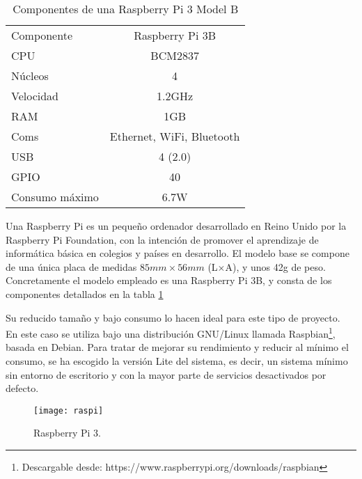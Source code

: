 \begin{table}[H]
	\begin{center}
		\begin{tabular}{l | c}\hline
			\toprule
			Componente & Raspberry Pi 3B\\
			\otoprule
			CPU & BCM2837\\
			Núcleos & 4\\
			Velocidad & 1.2GHz\\
			RAM & 1GB\\
			Coms & Ethernet, WiFi, Bluetooth\\
			USB & 4 (2.0)\\
			GPIO & 40\\
			Consumo máximo & 6.7W\\
			\bottomrule
		\end{tabular}
		\caption{Componentes de una Raspberry Pi 3 Model B}
		\label{tb:raspi3hardware}
	\end{center}
\end{table}

\noindent Una Raspberry Pi es un pequeño ordenador desarrollado en Reino Unido por la Raspberry Pi Foundation, con la intención de promover el aprendizaje de informática básica en colegios y países en desarrollo. El modelo base se compone de una única placa de medidas $85mm \times 56mm$ (L$\times$A), y unos 42g de peso.\\Concretamente el modelo empleado es una Raspberry Pi 3B, y consta de los componentes detallados en la tabla \ref{tb:raspi3hardware}



\noindent Su reducido tamaño y bajo consumo lo hacen ideal para este tipo de proyecto. \\En este caso se utiliza bajo una distribución GNU/Linux llamada Raspbian\footnote{Descargable desde: https://www.raspberrypi.org/downloads/raspbian}, basada en Debian. Para tratar de mejorar su rendimiento y reducir al mínimo el consumo, se ha escogido la versión Lite del sistema, es decir, un sistema mínimo sin entorno de escritorio y con la mayor parte de servicios desactivados por defecto.

\begin{figure}
	\centering
	\texttt{[image: raspi]}
	\caption{Raspberry Pi 3.}\label{fig:raspi3b}
\end{figure}

